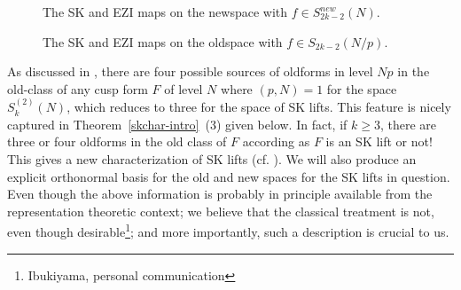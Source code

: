 \documentclass[11pt]{amsart}
\numberwithin{equation}{section}
\theoremstyle{plain}
\theoremstyle{definition}
\newcommand{\thmref}[1]{Theorem~\ref{#1}}
\newcommand{\mc}{\mathcal}
\newcommand{\sktwon}{S_k^{(2)}(N)}
\begin{document}
\begin{figure}[!htbp]
\centering
{}
\caption{ {\small The SK and EZI maps on the newspace with $f\in S_{2k-2}^{new}(N)$.}}
\end{figure}
\begin{figure}[!htbp]
\caption{{\small The SK and EZI maps on the oldspace with $f \in S_{2k-2}(N/p)$.}}
\end{figure}
As discussed in  \cite{schmidt-SKlift}, there are four possible sources of oldforms in level $Np$ in the old-class of any cusp form $F$ of level $N$ where $(p,N)=1$ for the space $\sktwon$, which reduces to three for the space of SK lifts. This feature is nicely captured in \thmref{skchar-intro}~(3) given below. In fact, if $k \ge 3$, there are three or four oldforms in the old class of $F$ according as $F$ is an SK lift or not! This gives a new characterization of SK lifts (cf. \cite{saha-pitale, farmer2013survey}).
We will also produce an explicit orthonormal basis for the old and new spaces for the SK lifts in question. Even though the above information is probably in principle available from the representation theoretic context; we believe that the classical treatment is not, even though desirable\footnote{Ibukiyama, personal communication}; and more importantly, such a description is crucial to us. 
\end{document}
